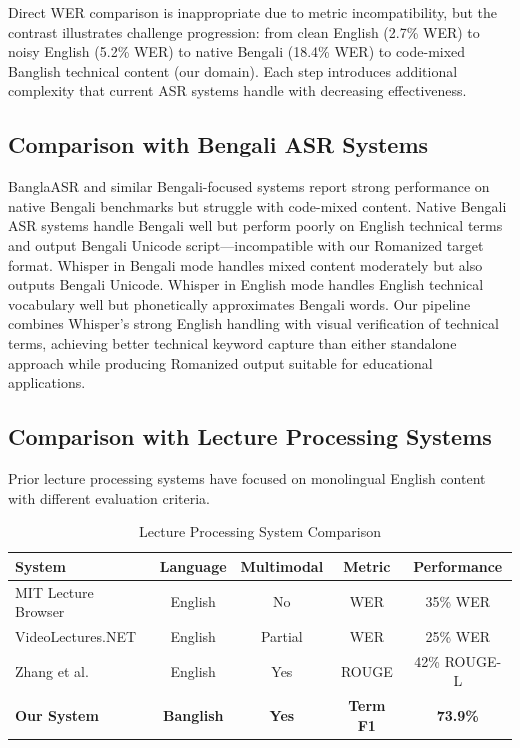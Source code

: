 Direct WER comparison is inappropriate due to metric incompatibility, but the contrast illustrates challenge progression: from clean English (2.7\% WER) to noisy English (5.2\% WER) to native Bengali (18.4\% WER) to code-mixed Banglish technical content (our domain). Each step introduces additional complexity that current ASR systems handle with decreasing effectiveness.

\subsection{Comparison with Bengali ASR Systems}

BanglaASR and similar Bengali-focused systems \cite{BanglaASR2023, Ahmed2022} report strong performance on native Bengali benchmarks but struggle with code-mixed content. Native Bengali ASR systems handle Bengali well but perform poorly on English technical terms and output Bengali Unicode script---incompatible with our Romanized target format. Whisper in Bengali mode handles mixed content moderately but also outputs Bengali Unicode. Whisper in English mode handles English technical vocabulary well but phonetically approximates Bengali words. Our pipeline combines Whisper's strong English handling with visual verification of technical terms, achieving better technical keyword capture than either standalone approach while producing Romanized output suitable for educational applications.

\subsection{Comparison with Lecture Processing Systems}

Prior lecture processing systems \cite{Glass2007, Zhang2021} have focused on monolingual English content with different evaluation criteria.

\begin{table}[h]
\centering
\caption{Lecture Processing System Comparison}
\label{tab:lecture_systems}
\begin{tabular}{|l|c|c|c|c|}
\hline
\textbf{System} & \textbf{Language} & \textbf{Multimodal} & \textbf{Metric} & \textbf{Performance} \\
\hline
MIT Lecture Browser \cite{Glass2007} & English & No & WER & 35\% WER \\
\hline
VideoLectures.NET & English & Partial & WER & 25\% WER \\
\hline
Zhang et al. \cite{Zhang2021} & English & Yes & ROUGE & 42\% ROUGE-L \\
\hline
\textbf{Our System} & \textbf{Banglish} & \textbf{Yes} & \textbf{Term F1} & \textbf{73.9\%} \\
\hline
\end{tabular}
\end{table}

